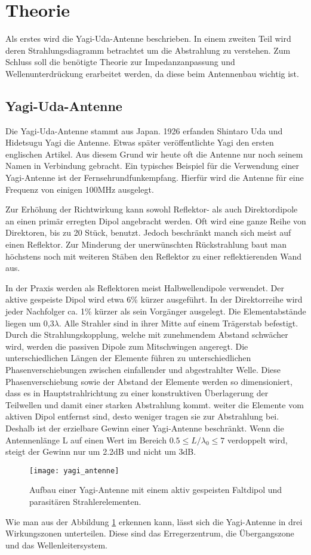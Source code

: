 \section{Theorie}
Als erstes wird die Yagi-Uda-Antenne beschrieben. In einem zweiten Teil wird deren Strahlungsdiagramm betrachtet um die Abstrahlung zu verstehen. Zum Schluss soll die benötigte Theorie zur Impedanzanpassung und Wellenunterdrückung erarbeitet werden, da diese beim Antennenbau wichtig ist.

\subsection{Yagi-Uda-Antenne}\label{sec:Yagi}
Die Yagi-Uda-Antenne stammt aus Japan. 1926 erfanden Shintaro Uda und Hidetsugu Yagi die Antenne. Etwas später veröffentlichte Yagi den ersten englischen Artikel. Aus diesem Grund wir heute oft die Antenne nur noch seinem Namen in Verbindung gebracht. Ein typisches Beispiel für die Verwendung einer Yagi-Antenne ist der Fernsehrundfunkempfang. Hierfür wird die Antenne für eine Frequenz von einigen 100MHz ausgelegt.

Zur Erhöhung der Richtwirkung kann sowohl Reflektor- als auch Direktordipole an einen primär erregten Dipol angebracht werden. Oft wird eine ganze Reihe von Direktoren, bis zu 20 Stück, benutzt. Jedoch beschränkt manch sich meist auf einen Reflektor. Zur Minderung der unerwünschten Rückstrahlung baut man höchstens noch mit weiteren Stäben den Reflektor zu einer reflektierenden Wand aus.

In der Praxis werden als Reflektoren meist Halbwellendipole verwendet. Der aktive gespeiste Dipol wird etwa 6\% kürzer ausgeführt. In der Direktorreihe wird jeder Nachfolger ca. 1\% kürzer als sein Vorgänger ausgelegt. Die Elementabstände liegen um 0,3$ \lambda $. Alle Strahler sind in ihrer Mitte auf einem Trägerstab befestigt. Durch die Strahlungskopplung, welche mit zunehmendem Abstand schwächer wird, werden die passiven Dipole zum Mitschwingen angeregt. Die unterschiedlichen Längen der Elemente führen zu unterschiedlichen Phasenverschiebungen zwischen einfallender und abgestrahlter Welle. Diese Phasenverschiebung sowie der Abstand der Elemente werden so dimensioniert, dass es in Hauptstrahlrichtung zu einer konstruktiven Überlagerung der Teilwellen und damit einer starken Abstrahlung kommt. weiter die Elemente vom aktiven Dipol entfernst sind, desto weniger tragen sie zur Abstrahlung bei. Deshalb ist der erzielbare Gewinn einer Yagi-Antenne beschränkt. Wenn die Antennenlänge L auf einen Wert im Bereich $ 0.5\leq L/\lambda_{0} \leq 7$ verdoppelt wird, steigt der Gewinn nur um 2.2dB und nicht um 3dB.
\begin{figure}[H]
	\centering
	\texttt{[image: yagi\_antenne]}
	\caption{Aufbau einer Yagi-Antenne mit einem aktiv gespeisten Faltdipol und parasitären Strahlerelementen.}\label{fig:yagi}
\end{figure}
Wie man aus der Abbildung \ref{fig:yagi} erkennen kann, lässt sich die Yagi-Antenne in drei Wirkungszonen unterteilen. Diese sind das Erregerzentrum, die Übergangszone und das Wellenleitersystem. 
